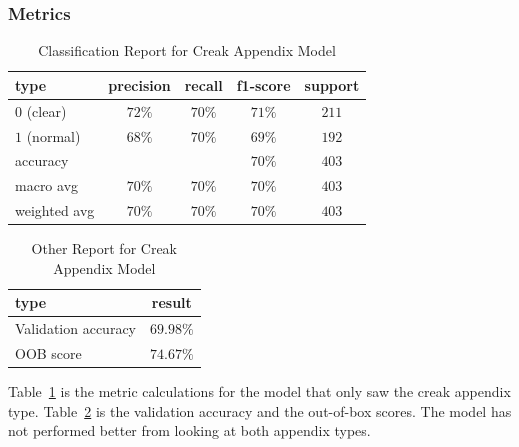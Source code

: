 \documentclass[12pt]{article}
\begin{document}
    \subsubsection{Metrics}
    \begin{table}[ht!]
        \centering
        \caption{Classification Report for Creak Appendix Model}
        \label{table:creak only}
        \begin{tabular}{|l|c|c|c|c|}
            \hline
            \textbf{type} & \textbf{precision} & \textbf{recall} & \textbf{f1-score} & \textbf{support} \\
            \hline
            \hline
            $0$ (clear)   & $72\%$             & $70\%$          & $71\%$            & $211$            \\
            \hline
            $1$ (normal)  & $68\%$             & $70\%$          & $69\%$            & $192$            \\
            \hline
            accuracy      &                    &                 & $70\%$            & $403$            \\
            \hline
            macro avg     & $70\%$             & $70\%$          & $70\%$            & $403$            \\
            \hline
            weighted avg  & $70\%$             & $70\%$          & $70\%$            & $403$            \\
            \hline
        \end{tabular}
    \end{table}

    \begin{table}[ht!]
        \centering
        \caption{Other Report for Creak Appendix Model}
        \label{table:other_results_creak}
        \begin{tabular}{|l|c|}
            \hline
            \textbf{type}       & \textbf{result} \\
            \hline
            \hline
            Validation accuracy & $69.98\%$       \\
            \hline
            OOB score           & $74.67\%$       \\
            \hline
        \end{tabular}
    \end{table}

    Table~\ref{table:creak only} is the metric calculations for the model that
    only saw the creak appendix type. Table~\ref{table:other_results_creak} is the
    validation accuracy and the out-of-box scores. The model has not performed
    better from looking at both appendix types.
\end{document}

